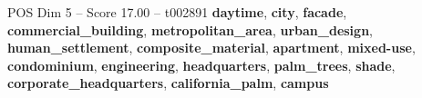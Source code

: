 \begin{textsample}{POS Dim 5 – Score 17.00 – t002891}  \label{ex:f5_pos_022}
\textbf{daytime}, \textbf{city}, \textbf{facade}, \textbf{commercial\_building}, \textbf{metropolitan\_area}, \textbf{urban\_design}, \textbf{human\_settlement}, \textbf{composite\_material}, \textbf{apartment}, \textbf{mixed-use}, \textbf{condominium}, \textbf{engineering}, \textbf{headquarters}, \textbf{palm\_trees}, \textbf{shade}, \textbf{corporate\_headquarters}, \textbf{california\_palm}, \textbf{campus}

\end{textsample}
